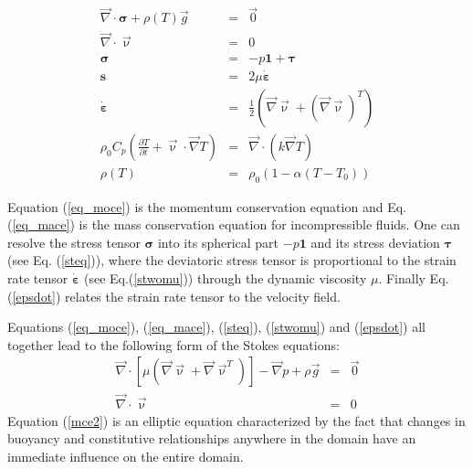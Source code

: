 \begin{eqnarray}
{\vec \nabla}\cdot {\bm \sigma} + \rho(T) {\vec g} &=& {\vec 0} \label{eq_moce}\\
{\vec \nabla}\cdot {\vec \upnu} &=& 0 \label{eq_mace}\\
{\bm \sigma} &=& -p {\bm 1} + {\bm \tau} \label{steq}\\
{\bm s} &=& 2 \mu \dot{\bm \varepsilon} \label{stwomu}\\
\dot{\bm \varepsilon}  &=& \frac{1}{2} \left( {\vec \nabla}{\vec \upnu} 
+ ({\vec \nabla}{\vec \upnu})^T  \right) \label{epsdot} \\
\rho_0 C_p \left( \frac{\partial T}{\partial t}  + {\vec \upnu}\cdot {\vec \nabla} T\right) 
&=& {\vec \nabla}\cdot (k {\vec \nabla}T)  \label{eqhte} \\
\rho(T) &=& \rho_0 (1 - \alpha (T-T_0)) 
\end{eqnarray}

Equation (\ref{eq_moce}) is the momentum conservation equation and 
Eq. (\ref{eq_mace}) is the mass conservation equation for incompressible fluids.
One can resolve the stress tensor ${\bm \sigma}$ into its spherical part $-p{\bm 1}$ and its stress deviation ${\bm \tau}$ (see Eq. (\ref{steq})), where the deviatoric stress tensor is proportional to the strain rate tensor $\dot{\bm \varepsilon}$ (see Eq.(\ref{stwomu})) through the dynamic viscosity $\mu$. Finally Eq. (\ref{epsdot}) relates the strain rate tensor to the velocity field.

Equations (\ref{eq_moce}), (\ref{eq_mace}), (\ref{steq}), (\ref{stwomu}) and (\ref{epsdot}) all together lead to the following form of the Stokes equations:
\begin{eqnarray}
{\vec \nabla}\cdot [\mu ({\vec\nabla} {\vec \upnu} + {\vec \nabla} {\vec \upnu}^T ) ] 
- {\vec \nabla}p + \rho {\vec g} &=& {\vec 0} \label{mce2} \\
{\vec \nabla}\cdot {\vec \upnu} &=& 0 \label{eq_mace2}
\end{eqnarray}
Equation (\ref{mce2}) is an elliptic equation characterized by the 
fact that changes in buoyancy and constitutive relationships anywhere in the domain have an immediate influence on the entire domain.

